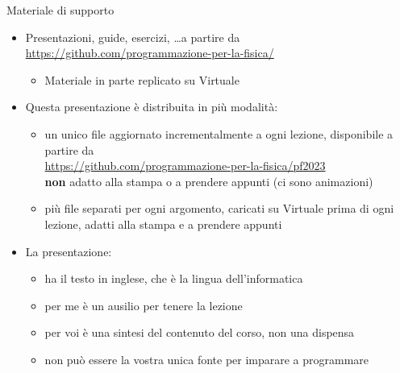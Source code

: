 \begin{frame}{Materiale di supporto}

  \begin{itemize}[<+->]

  \item Presentazioni, guide, esercizi, \ldots a partire da
    \url{https://github.com/programmazione-per-la-fisica/}
    \begin{itemize}[<.->]
    \item Materiale in parte replicato su Virtuale
    \end{itemize}

  \item Questa presentazione è distribuita in più modalità:
    \begin{itemize}[<.->]
    \item un unico file  aggiornato incrementalmente a ogni lezione,
      disponibile a partire da\\
      {\smaller \url{https://github.com/programmazione-per-la-fisica/pf2023}}\\
      \textbf{non} adatto alla stampa o a prendere appunti (ci sono animazioni)
    \item più file  separati per ogni argomento, caricati su Virtuale
      prima di ogni lezione, adatti alla stampa e a prendere appunti
    \end{itemize}

  \item La presentazione:
    \begin{itemize}[<.->]
    \item ha il testo in inglese, che è la lingua dell'informatica
    \item per me è un ausilio per tenere la lezione
    \item per voi è una sintesi del contenuto del corso, non una dispensa
    \item non può essere la vostra unica fonte per imparare a programmare
    \end{itemize}

  \end{itemize}
  
\end{frame}


